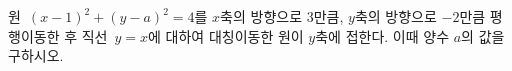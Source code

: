 원~$(x-1)^2+(y-a)^2=4$를 $x$축의 방향으로 $3$만큼, $y$축의 방향으로 $-2$만큼 평행이동한 후 직선~$y=x$에 대하여 대칭이동한 원이 $y$축에 접한다. 이때 양수 $a$의 값을 구하시오.
